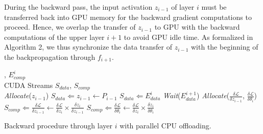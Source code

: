 \documentclass[11pt,onecolumn]{article}
\begin{document}

During the backward pass, the input activation $z_{i-1}$ 
of layer $i$ must be transferred back into GPU memory
for the backward gradient computations to proceed.
Hence, we overlap the transfer of $z_{i-1}$ to GPU 
with the backward computations of the upper layer $i+1$ to avoid GPU idle time.
As formalized in Algorithm 2, we thus synchronize the data transfer of $z_{i-1}$ 
with the beginning of the backpropagation through $f_{i+1}$.

\begin{algorithm}[h]
	, $E_{comp}^{i}$
     	\\ \hspace{1.1cm} CUDA Streams $S_{data}$, $S_{comp}$%
	\vspace{1mm} \\
	\vspace{1mm}
	\textit{Allocate}($z_{i-1}$)\;
	\vspace{1mm}
	$S_{data} \Leftarrow z_{i-1} \leftarrow P_{i-1}$\;
	$S_{data} \Leftarrow E_{data}^i$\;
	\vspace{1mm}
	\textit{Wait}($E_{data}^{i+1}$)\;
	\textit{Allocate}($\frac{\delta \mathcal{L}}{\delta z_{i-1}}$, $\frac{\delta \mathcal{L}}{\delta \theta_i}$)\;
	\vspace{1mm}
	$S_{comp} \Leftarrow \frac{\delta \mathcal{L}}{\delta z_{i-1}} \leftarrow \frac{\delta \mathcal{L}}{\delta z_{i}}  \times \frac{\delta z_{i}}{\delta z_{i-1}}$\;
	$S_{comp} \Leftarrow \frac{\delta \mathcal{L}}{\delta \theta_i} \leftarrow \frac{\delta \mathcal{L}}{\delta z_{i}}  \times \frac{\delta z_{i}}{\delta \theta_i}$\;
	\caption{Backward procedure through layer $i$ with parallel CPU offloading.}
\end{algorithm}
\end{document}
